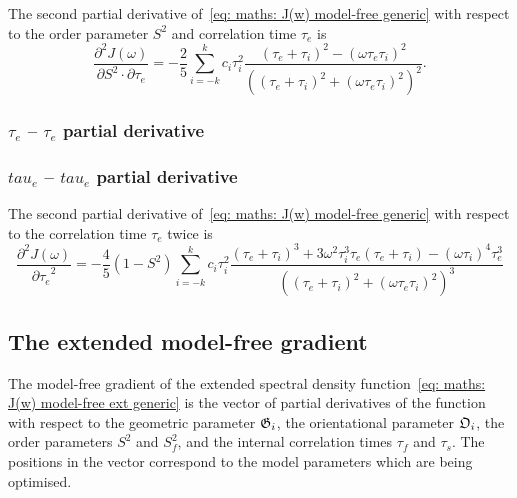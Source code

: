 The second partial derivative of~\eqref{eq: maths: J(w) model-free generic} with respect to the order parameter $S^2$ and correlation time $\tau_e$ is
\begin{equation}
    \frac{\partial^2 J(\omega)}{\partial S^2 \cdot \partial \tau_e} = -\frac{2}{5} \sum_{i=-k}^k c_i \tau_i^2
        \frac{(\tau_e + \tau_i)^2 - (\omega \tau_e \tau_i)^2}{\left((\tau_e + \tau_i)^2 + (\omega \tau_e \tau_i)^2 \right)^2}.
\end{equation}



\begin{latexonly}
    \subsubsection{$\tau_e$ -- $\tau_e$ partial derivative}
\end{latexonly}
\begin{htmlonly}
    \subsubsection{$tau_e$ -- $tau_e$ partial derivative}
\end{htmlonly}

The second partial derivative of~\eqref{eq: maths: J(w) model-free generic} with respect to the correlation time $\tau_e$ twice is
\begin{equation}
    \frac{\partial^2 J(\omega)}{{\partial \tau_e}^2} = -\frac{4}{5} (1 - S^2) \sum_{i=-k}^k c_i \tau_i^2
        \frac{(\tau_e + \tau_i)^3  +  3 \omega^2 \tau_i^3 \tau_e (\tau_e + \tau_i)  -  (\omega \tau_i)^4 \tau_e^3}
            {\left((\tau_e + \tau_i)^2 + (\omega \tau_e \tau_i)^2 \right)^3}
\end{equation}





\newpage
\subsection{The extended model-free gradient}

The model-free gradient of the extended spectral density function~\eqref{eq: maths: J(w) model-free ext generic} is the vector of partial derivatives of the function with respect to the geometric parameter $\mathfrak{G}_i$, the orientational parameter $\mathfrak{O}_i$, the order parameters $S^2$ and $S^2_f$, and the internal correlation times $\tau_f$ and $\tau_s$.
The positions in the vector correspond to the model parameters which are being optimised.



